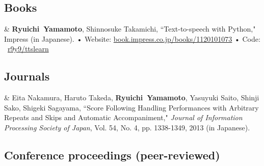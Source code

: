 \documentclass[11pt, a4paper]{article}
\newcommand{\FirstName}{Ryuichi}
\newcommand{\LastName}{Yamamoto}
\newcommand{\MyName}{\FirstName\ \LastName}
\newcommand{\GitHub}[1]{\newline • Code: \faGithub\ \href{https://github.com/#1}{#1}}
\newcommand{\Website}[1]{\newline • Website: \href{https://#1}{#1}}
\newcommand{\Year}[1]{\fontsize{10pt}{0}\selectfont #1}
\begin{document}

\subsection{Books}


\begin{EntriesTable}
\Year{2021}  &
  \textbf{\MyName}, Shinnosuke Takamichi,
  ``Text-to-speech with Python," Impress (in Japanese).
  \Website{book.impress.co.jp/books/1120101073}
  \GitHub{r9y9/ttslearn}
\end{EntriesTable}

\subsection{Journals}

\begin{EntriesTable}
\Year{2013}  &
  Eita Nakamura, Haruto Takeda, \textbf{\MyName}, Yasuyuki Saito, Shinji Sako, Shigeki Sagayama,
  ``Score Following Handling Performances with Arbitrary Repeats and Skips and Automatic Accompaniment,"
  \emph{Journal of Information Processing Society of Japan}, Vol. 54, No. 4, pp. 1338-1349, 2013 (in Japanese).
\end{EntriesTable}


\subsection{Conference proceedings (peer-reviewed)}
\end{document}
